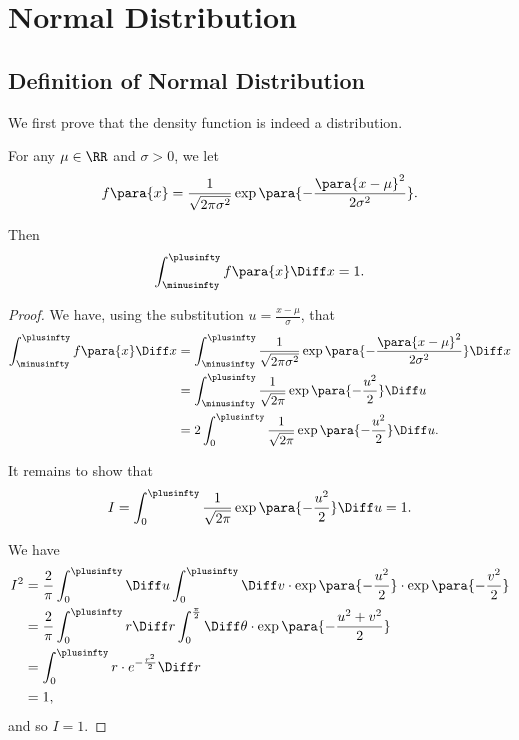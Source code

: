 \section{Normal Distribution}

\subsection{Definition of Normal Distribution}

We first prove that the density function is indeed a distribution.

\begin{proposition}
    \label{prop:gaussian-integral}%
    For any \(\mu \in \RR\) and \(\sigma > 0\), we let
    \[
        f\para{x} = \frac{1}{\sqrt{2 \pi \sigma^2}} \exp\para{-\frac{\para{x - \mu}^2}{2 \sigma^2}}.
    \]

    Then
    \[
        \int_{\minusinfty}^{\plusinfty} f\para{x} \Diff x = 1.
    \]
\end{proposition}

\begin{proof}
    We have, using the substitution \(u = \frac{x - \mu}{\sigma}\), that
    \begin{align*}
        \int_{\minusinfty}^{\plusinfty} f\para{x} \Diff x &= \int_{\minusinfty}^{\plusinfty} \frac{1}{\sqrt{2 \pi \sigma^2}} \exp\para{-\frac{\para{x - \mu}^2}{2 \sigma^2}} \Diff x \\
        &= \int_{\minusinfty}^{\plusinfty} \frac{1}{\sqrt{2 \pi}} \exp\para{- \frac{u^2}{2}} \Diff u \\
        &= 2 \int_{0}^{\plusinfty} \frac{1}{\sqrt{2 \pi}} \exp\para{- \frac{u^2}{2}} \Diff u.
    \end{align*}

    It remains to show that
    \[
        I = \int_{0}^{\plusinfty} \frac{1}{\sqrt{2 \pi}} \exp\para{- \frac{u^2}{2}} \Diff u = 1.
    \]

    We have
    \begin{align*}
        I^2 &= \frac{2}{\pi} \int_{0}^{\plusinfty} \Diff u \int_{0}^{\plusinfty} \Diff v \cdot \exp\para{- \frac{u^2}{2}} \cdot \exp\para{- \frac{v^2}{2}} \\
        &= \frac{2}{\pi} \int_{0}^{\plusinfty} r \Diff r \int_{0}^{\frac{\pi}{2}} \Diff \theta \cdot \exp\para{- \frac{u^2 + v^2}{2}} \\
        &= \int_{0}^{\plusinfty} r \cdot e^{-\frac{r^2}{2}} \Diff r \\
        &= 1,
    \end{align*}
    and so \(I = 1\).
\end{proof}

